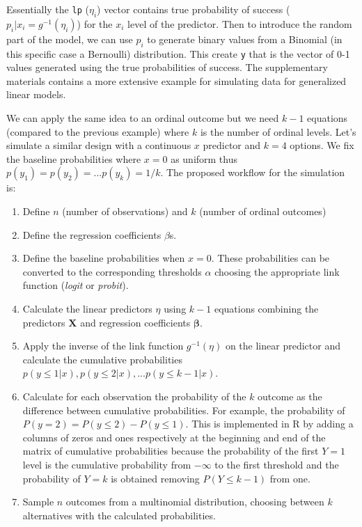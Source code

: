 \documentclass[
  man,floatsintext]{apa6}
\providecommand{\tightlist}{%
  \setlength{\itemsep}{0pt}\setlength{\parskip}{0pt}}
\begin{document}
\normalsize

Essentially the \texttt{lp} (\(\eta_i\)) vector contains true probability of success (\(p_i|x_i = g^{-1}(\eta_i)\)) for the \(x_i\) level of the predictor. Then to introduce the random part of the model, we can use \(p_i\) to generate binary values from a Binomial (in this specific case a Bernoulli) distribution. This create \texttt{y} that is the vector of 0-1 values generated using the true probabilities of success. The supplementary materials contains a more extensive example for simulating data for generalized linear models.

We can apply the same idea to an ordinal outcome but we need \(k - 1\) equations (compared to the previous example) where \(k\) is the number of ordinal levels. Let's simulate a similar design with a continuous \(x\) predictor and \(k = 4\) options. We fix the baseline probabilities where \(x = 0\) as uniform thus \(p(y_1) = p(y_2) = ... p(y_k) = 1/k\). The proposed workflow for the simulation is:

\begin{enumerate}
\def\labelenumi{\arabic{enumi}.}
\tightlist
\item
  Define \(n\) (number of observations) and \(k\) (number of ordinal outcomes)
\item
  Define the regression coefficients \(\beta\)s.
\item
  Define the baseline probabilities when \(x = 0\). These probabilities can be converted to the corresponding thresholds \(\alpha\) choosing the appropriate link function (\emph{logit} or \emph{probit}).
\item
  Calculate the linear predictors \(\eta\) using \(k - 1\) equations combining the predictors \(\mathbf{X}\) and regression coefficients \(\boldsymbol{\beta}\).
\item
  Apply the inverse of the link function \(g^{-1}(\eta)\) on the linear predictor and calculate the cumulative probabilities \(p(y \leq 1|x), p(y \leq 2|x), ... p(y \leq k - 1|x)\).
\item
  Calculate for each observation the probability of the \(k\) outcome as the difference between cumulative probabilities. For example, the probability of \(P(y = 2) = P(y \leq 2) - P(y \leq 1)\). This is implemented in R by adding a columns of zeros and ones respectively at the beginning and end of the matrix of cumulative probabilities because the probability of the first \(Y = 1\) level is the cumulative probability from \(- \infty\) to the first threshold and the probability of \(Y = k\) is obtained removing \(P(Y \leq k - 1)\) from one.
\item
  Sample \(n\) outcomes from a multinomial distribution, choosing between \(k\) alternatives with the calculated probabilities.
\end{enumerate}
\end{document}
